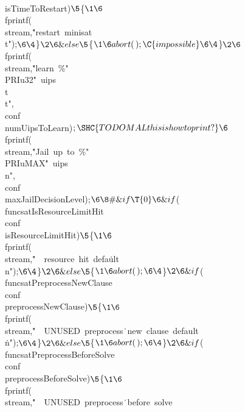 {{{{{\\{isTimeToRestart}){}$\5
${}\{{}$\1\6
${}\\{fprintf}(\\{stream},\.{"restart\ minisat\\t"});{}$\6
\4${}\}{}$\2\6
\&{else}\5
${}\{{}$\1\6
\\{abort}(\,);\C{ impossible }\6
\4${}\}{}$\2\6
${}\\{fprintf}(\\{stream},\.{"learn\ \%"}\\{PRIu32}\.{"\ uips\\t\\t"},%
\\{conf}\MG\\{numUipsToLearn}){}$;\SHC{ TODO MAL this is how to print? }\6
${}\\{fprintf}(\\{stream},\.{"Jail\ up\ to\ \%"}\\{PRIuMAX}\.{"\ uips\\n"},%
\\{conf}\MG\\{maxJailDecisionLevel});{}$\6
\8\#\&{if} \T{0}\6
\&{if} ${}(\\{funcsatIsResourceLimitHit}\E\\{conf}\MG\\{isResourceLimitHit}){}$%
\5
${}\{{}$\1\6
${}\\{fprintf}(\\{stream},\.{"\ \ resource\ hit\ defa}\)\.{ult\\n"});{}$\6
\4${}\}{}$\2\6
\&{else}\5
${}\{{}$\1\6
\\{abort}(\,);\6
\4${}\}{}$\2\6
\&{if} ${}(\\{funcsatPreprocessNewClause}\E\\{conf}\MG%
\\{preprocessNewClause}){}$\5
${}\{{}$\1\6
${}\\{fprintf}(\\{stream},\.{"\ \ UNUSED\ preprocess}\)\.{\ new\ clause\
default\\}\)\.{n"});{}$\6
\4${}\}{}$\2\6
\&{else}\5
${}\{{}$\1\6
\\{abort}(\,);\6
\4${}\}{}$\2\6
\&{if} ${}(\\{funcsatPreprocessBeforeSolve}\E\\{conf}\MG%
\\{preprocessBeforeSolve}){}$\5
${}\{{}$\1\6
${}\\{fprintf}(\\{stream},\.{"\ \ UNUSED\ preprocess}\)\.{\ before\ solve\
}}}}}}
